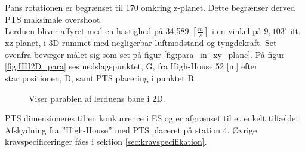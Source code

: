 Pans rotationen er begrænset til 170\degree{} omkring z-planet. Dette begrænser derved PTS maksimale overshoot.\\

Lerduen bliver affyret med en hastighed på 34,589 \([\frac{m}{s}]\) i en vinkel på \(9,103^{\circ}\) ift. xz-planet, i 3D-rummet med negligerbar luftmodstand og tyngdekraft. Set ovenfra bevæger målet sig som set på figur \ref{fig:para_in_xy_plane}. 
På figur \ref{fig:HH2D_para} ses nedslagspunktet, G, fra High-House 52 [m] efter startpositionen, D, samt  
PTS placering i punktet B.\\
\begin{figure}[h!]
\centering
{}
\caption[Lerduens parabel i 2D]{Viser parablen af lerduens bane i 2D.}
\end{figure}

PTS dimensioneres til en konkurrence i ES og er afgrænset til et enkelt tilfælde: Afskydning fra ”High-House” med PTS placeret på station 4. Øvrige kravspecificeringer fåes i sektion \ref{sec:kravspecifikation}.